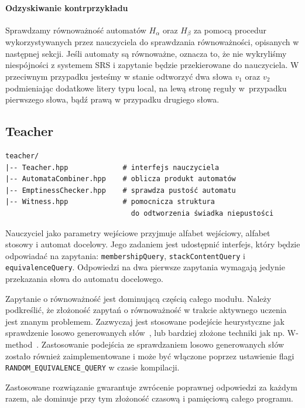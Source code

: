 \paragraph{Odzyskiwanie kontrprzykładu}
Sprawdzamy równoważność automatów $H_{\alpha}$ oraz $H_{\beta}$ za pomocą procedur wykorzystywanych przez nauczyciela do sprawdzania równoważności,
opisanych w następnej sekcji. Jeśli automaty są równoważne, oznacza to, że nie wykryliśmy niespójności z systemem SRS i zapytanie będzie
przekierowane do nauczyciela. W przeciwnym przypadku jesteśmy w stanie odtworzyć dwa słowa $v_1$ oraz $v_2$ podmieniając dodatkowe
litery typu local, na lewą stronę reguły w~przypadku pierwszego słowa, bądź prawą w przypadku drugiego słowa.

\subsection{Teacher}

\begin{verbatim}
teacher/
|-- Teacher.hpp             # interfejs nauczyciela
|-- AutomataCombiner.hpp    # oblicza produkt automatów
|-- EmptinessChecker.hpp    # sprawdza pustość automatu
|-- Witness.hpp             # pomocnicza struktura 
                              do odtworzenia świadka niepustości
\end{verbatim}

Nauczyciel jako parametry wejściowe przyjmuje alfabet wejściowy, alfabet stosowy i automat docelowy. Jego zadaniem jest udostępnić interfejs,
który będzie odpowiadać na zapytania: \texttt{membershipQuery}, \texttt{stackContentQuery} i \texttt{equivalenceQuery}.
Odpowiedzi na dwa pierwsze zapytania wymagają jedynie przekazania słowa do automatu docelowego.

Zapytanie o równoważność jest dominującą
częścią całego modułu. Należy podkreślić, że złożoność zapytań o równoważność w trakcie aktywnego uczenia jest znanym problemem.
Zazwyczaj jest stosowane podejście heurystyczne jak sprawdzenie losowo generowanych słów~\cite[5.3 Learning Algorithm]{json},
lub bardziej złożone techniki jak np. W-method~\cite{Wmethod}. Zastosowanie podejścia ze sprawdzaniem losowo generowanych słów zostało
również zaimplementowane i może być włączone poprzez ustawienie flagi \texttt{RANDOM\_EQUIVALENCE\_QUERY} w czasie kompilacji.

Zastosowane rozwiązanie gwarantuje zwrócenie poprawnej odpowiedzi za każdym razem, ale dominuje przy tym złożoność czasową i pamięciową całego programu.

